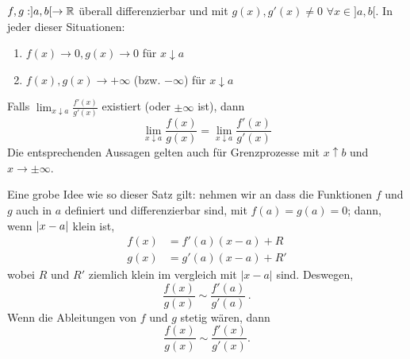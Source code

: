 \begin{Sat}
  $f,g:]a,b[\to\mathbb{R}$ überall differenzierbar und mit $g(x), 
g'(x)\neq 0$ $\forall x\in ]a,b[$. In jeder dieser Situationen:
  \begin{enumerate}
    \item $f(x)\to 0, g(x)\to 0$ für $x\downarrow a$
    \item $f(x), g(x) \to +\infty$ (bzw. $-\infty$) für $x\downarrow a$
  \end{enumerate}
  Falls $\lim_{x\downarrow a}\frac{f'(x)}{g'(x)}$ existiert (oder $\pm \infty$ ist), dann
  \[\lim_{x\downarrow a}\frac{f(x)}{g(x)}=\lim_{x\downarrow a}\frac{f'(x)}{g'(x)}\]
Die entsprechenden Aussagen gelten auch f\"ur Grenzprozesse mit $x\uparrow b$ und
$x\to \pm \infty$.
\end{Sat}
Eine grobe Idee wie so dieser Satz gilt: nehmen wir an dass
die Funktionen $f$ und $g$ auch in $a$ definiert und differenzierbar sind, mit
$f(a)=g(a)=0$; dann, wenn $\mathopen| x-a \mathclose|$ klein ist,
  \begin{eqnarray*}
    f(x)&=f'(a)(x-a)+R\\
    g(x)&=g'(a)(x-a)+R'
  \end{eqnarray*}
wobei $R$ und $R'$ ziemlich klein im vergleich mit $|x-a|$ sind. Deswegen,
  \[\frac{f(x)}{g(x)}\sim\frac{f'(a)}{g'(a)}\, .\]
Wenn die Ableitungen von $f$ und $g$ stetig w\"aren, dann
\[
 \frac{f(x)}{g(x)}\sim \frac{f'(x)}{g'(x)}.
\]


